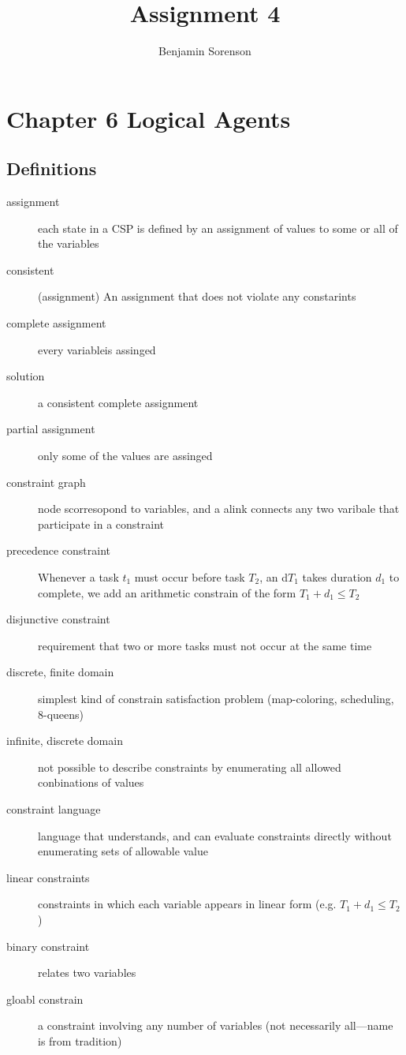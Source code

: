 \documentclass[11pt]{article}
\begin{document}
\author{Benjamin Sorenson} \title{Assignment 4}
\maketitle
\section{Chapter 6 Logical Agents}
\subsection{Definitions}
\begin{description}
\item[assignment] each state in a CSP is defined by an assignment of
  values to some or all of the variables
\item[consistent](assignment) An assignment that does not violate any
  constarints
\item[complete assignment] every variableis assinged
\item[solution] a consistent complete assignment
\item[partial assignment] only some of the values are assinged
\item[constraint graph] node scorresopond to variables, and a alink
  connects any two varibale that participate in a constraint
\item[precedence constraint] Whenever a task \(t_1\)
  must occur before task \(T_2\),
  an d\(T_1\)
  takes duration \(d_1\)
  to complete, we add an arithmetic constrain of the form
  \(T_1 + d_1 \le T_2\)
\item[disjunctive constraint] requirement that two or more tasks must
  not occur at the same time
\item[discrete, finite domain]simplest kind of constrain satisfaction
  problem (map-coloring, scheduling, 8-queens)
\item[infinite, discrete domain]not possible to describe constraints
  by enumerating all allowed conbinations of values
\item[constraint language] language that understands, and can evaluate
  constraints directly without enumerating sets of allowable value
\item[linear constraints]constraints in which each variable appears in
  linear form (e.g. \(T_1 + d_1 \le T_2\) )
\item[binary constraint] relates two variables
\item[gloabl constrain] a constraint involving any number of variables
  (not necessarily all---name is from tradition)

\end{description}
  
\end{document}
